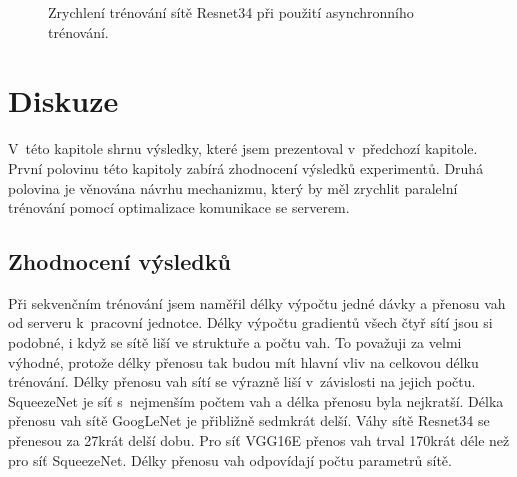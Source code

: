 \begin{figure}
\centering
{}
\caption{Zrychlení trénování sítě Resnet34 při použití asynchronního trénování.}
\label{gr:async_resnet34}
\end{figure}


\chapter{Diskuze}
\label{chap:disc}

V~této kapitole shrnu výsledky, které jsem prezentoval v~předchozí kapitole.
První polovinu této kapitoly zabírá zhodnocení výsledků experimentů.
Druhá polovina je věnována návrhu mechanizmu, který by měl zrychlit paralelní trénování pomocí optimalizace komunikace se serverem.

\section{Zhodnocení výsledků}
\label{sec:res_eval}

Při sekvenčním trénování jsem naměřil délky výpočtu jedné dávky a přenosu vah od serveru k~pracovní jednotce.
Délky výpočtu gradientů všech čtyř sítí jsou si podobné, i když se sítě liší ve struktuře a počtu vah.
To považuji za velmi výhodné, protože délky přenosu tak budou mít hlavní vliv na celkovou délku trénování.
Délky přenosu vah sítí se výrazně liší v~závislosti na jejich počtu.
SqueezeNet je síť s~nejmenším počtem vah a délka přenosu byla nejkratší.
Délka přenosu vah sítě GoogLeNet je přibližně sedmkrát delší.
Váhy sítě Resnet34 se přenesou za 27krát delší dobu.
Pro síť VGG16E přenos vah trval 170krát déle než pro síť SqueezeNet.
Délky přenosu vah odpovídají počtu parametrů sítě.

